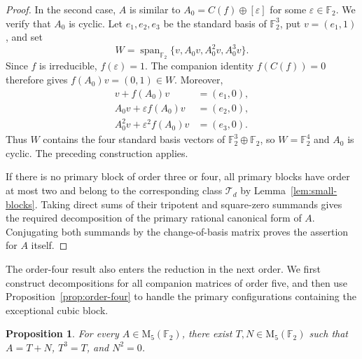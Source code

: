 \documentclass[12pt]{amsart}
\newtheorem{proposition}[theorem]{Proposition}
\theoremstyle{remark}
\numberwithin{equation}{section}
\theoremstyle{definition}
\newcommand{\F}{\mathbb F}
\newcommand{\Mat}{\mathrm M}
\newcommand{\TS}{\mathcal T}
\begin{document}
\begin{proof}
In the second case, $A$ is similar to $A_0=C(f)\oplus[\varepsilon]$ for some $\varepsilon\in\F_2$. We verify that $A_0$ is cyclic. Let $e_1,e_2,e_3$ be the standard basis of $\F_2^3$, put $v=(e_1,1)$, and set
\[
 W=\operatorname{span}_{\F_2}\{v,A_0v,A_0^2v,A_0^3v\}.
\]
Since $f$ is irreducible, $f(\varepsilon)=1$. The companion identity $f(C(f))=0$ therefore gives $f(A_0)v=(0,1)\in W$. Moreover,
\begin{align*}
 v+f(A_0)v&=(e_1,0),\\
 A_0v+\varepsilon f(A_0)v&=(e_2,0),\\
 A_0^2v+\varepsilon^2 f(A_0)v&=(e_3,0).
\end{align*}
Thus $W$ contains the four standard basis vectors of $\F_2^3\oplus\F_2$, so $W=\F_2^4$ and $A_0$ is cyclic. The preceding construction applies.

If there is no primary block of order three or four, all primary blocks have order at most two and belong to the corresponding class $\TS_d$ by Lemma~\ref{lem:small-blocks}. Taking direct sums of their tripotent and square-zero summands gives the required decomposition of the primary rational canonical form of $A$. Conjugating both summands by the change-of-basis matrix proves the assertion for $A$ itself.
\end{proof}

The order-four result also enters the reduction in the next order. We first construct decompositions for all companion matrices of order five, and then use Proposition~\ref{prop:order-four} to handle the primary configurations containing the exceptional cubic block.

\begin{proposition}\label{prop:order-five}
For every $A\in\Mat_5(\F_2)$, there exist $T,N\in\Mat_5(\F_2)$ such that $A=T+N$, $T^3=T$, and $N^2=0$.
\end{proposition}
\end{document}
